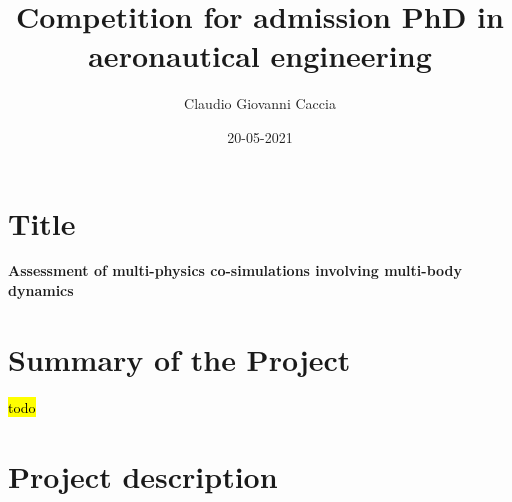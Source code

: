 \documentclass[a4paper]{article}
\title{Competition for admission PhD in \\ aeronautical engineering}
\author{Claudio Giovanni Caccia}
\date{20-05-2021}
\begin{document}
\maketitle

\section*{Title}

\textbf{Assessment of multi-physics co-simulations involving multi-body dynamics}

\section*{Summary of the Project}

\hl{todo}





\section*{Project description}









\newpage








%



\printbibliography
\end{document}
